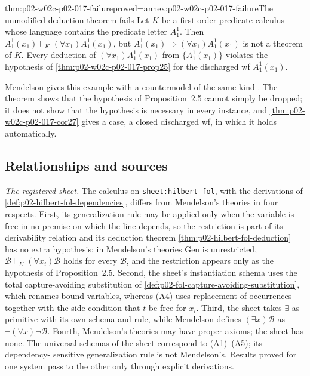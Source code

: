 \begin{hbtheorem}{thm:p02-w02c-p02-017-failure}{proved=annex:p02-w02c-p02-017-failure}{The unmodified deduction theorem fails}
Let \(K\) be a first-order predicate calculus whose language contains the
predicate letter \(A^1_1\).  Then
\(A^1_1(x_1)\vdash_K(\forall x_1)A^1_1(x_1)\), but
\(A^1_1(x_1)\Rightarrow(\forall x_1)A^1_1(x_1)\) is not a theorem of \(K\).
Every deduction of \((\forall x_1)A^1_1(x_1)\) from \(\{A^1_1(x_1)\}\) violates
the hypothesis of \cref{thm:p02-w02c-p02-017-prop25} for the discharged wf
\(A^1_1(x_1)\).
\end{hbtheorem}

Mendelson gives this example with a countermodel of the same kind
\cite[\S 2.4, p.~73]{Mendelson1997}.  The theorem shows that the hypothesis of
Proposition~2.5 cannot simply be dropped; it does not show that the hypothesis
is necessary in every instance, and
\cref{thm:p02-w02c-p02-017-cor27} gives a case, a closed discharged wf, in
which it holds automatically.

\subsection{Relationships and sources}
\label{sec:p02-w02c-p02-017-relations}

\emph{The registered sheet.}  The calculus on
\texttt{sheet:\allowbreak hilbert-fol}, with the derivations
of \cref{def:p02-hilbert-fol-dependencies}, differs from Mendelson's theories
in four respects.  First, its generalization rule may be applied only when the
variable is free in no premise on which the line depends, so the restriction
is part of its derivability relation and its deduction theorem
\cref{thm:p02-hilbert-fol-deduction} has no extra hypothesis; in Mendelson's
theories Gen is unrestricted, \(\mathscr B\vdash_K(\forall x_i)\mathscr B\)
holds for every \(\mathscr B\), and the restriction appears only as the
hypothesis of Proposition~2.5.  Second, the sheet's instantiation schema uses
the total capture-avoiding substitution of
\cref{def:p02-fol-capture-avoiding-substitution}, which renames bound
variables, whereas (A4) uses replacement of occurrences together with the
side condition that \(t\) be free for \(x_i\).  Third, the sheet takes
\(\exists\) as primitive with its own schema and rule, while Mendelson defines
\((\exists x)\mathscr B\) as \(\neg(\forall x)\neg\mathscr B\).  Fourth,
Mendelson's theories may have proper axioms; the sheet has none.  The
universal schemas of the sheet correspond to (A1)--(A5); its dependency-
sensitive generalization rule is not Mendelson's.  Results proved for one
system pass to the other only through explicit derivations.

